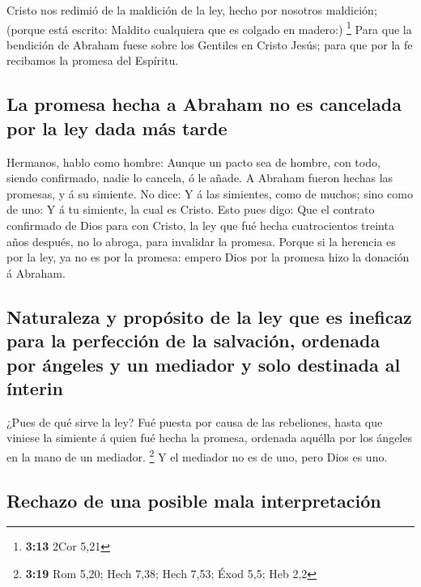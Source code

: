  Cristo nos redimió de la maldición de la ley, hecho por
nosotros maldición; (porque está escrito: Maldito cualquiera que es
colgado en madero:) \footnote{\textbf{3:13} 2Cor 5,21} 
Para que la bendición de Abraham fuese sobre los Gentiles en Cristo
Jesús; para que por la fe recibamos la promesa del Espíritu.

\hypertarget{la-promesa-hecha-a-abraham-no-es-cancelada-por-la-ley-dada-muxe1s-tarde}{%
\subsection{La promesa hecha a Abraham no es cancelada por la ley dada
más
tarde}\label{la-promesa-hecha-a-abraham-no-es-cancelada-por-la-ley-dada-muxe1s-tarde}}

 Hermanos, hablo como hombre: Aunque un pacto sea de
hombre, con todo, siendo confirmado, nadie lo cancela, ó le añade.
 A Abraham fueron hechas las promesas, y á su simiente. No
dice: Y á las simientes, como de muchos; sino como de uno: Y á tu
simiente, la cual es Cristo.  Esto pues digo: Que el
contrato confirmado de Dios para con Cristo, la ley que fué hecha
cuatrocientos treinta años después, no lo abroga, para invalidar la
promesa.  Porque si la herencia es por la ley, ya no es por
la promesa: empero Dios por la promesa hizo la donación á Abraham.

\hypertarget{naturaleza-y-propuxf3sito-de-la-ley-que-es-ineficaz-para-la-perfecciuxf3n-de-la-salvaciuxf3n-ordenada-por-uxe1ngeles-y-un-mediador-y-solo-destinada-al-uxednterin}{%
\subsection{Naturaleza y propósito de la ley que es ineficaz para la
perfección de la salvación, ordenada por ángeles y un mediador y solo
destinada al
ínterin}\label{naturaleza-y-propuxf3sito-de-la-ley-que-es-ineficaz-para-la-perfecciuxf3n-de-la-salvaciuxf3n-ordenada-por-uxe1ngeles-y-un-mediador-y-solo-destinada-al-uxednterin}}

 ¿Pues de qué sirve la ley? Fué puesta por causa de las
rebeliones, hasta que viniese la simiente á quien fué hecha la promesa,
ordenada aquélla por los ángeles en la mano de un mediador. \footnote{\textbf{3:19}
  Rom 5,20; Hech 7,38; Hech 7,53; Éxod 5,5; Heb 2,2}  Y el
mediador no es de uno, pero Dios es uno.

\hypertarget{rechazo-de-una-posible-mala-interpretaciuxf3n}{%
\subsection{Rechazo de una posible mala
interpretación}\label{rechazo-de-una-posible-mala-interpretaciuxf3n}}

